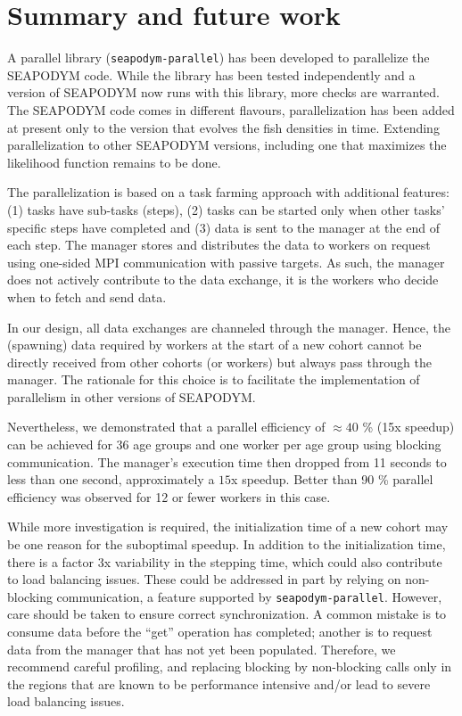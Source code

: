 \documentclass[a4paper,oneside,12pt]{article}
\begin{document}
\section{Summary and future work}

A parallel library (\verb|seapodym-parallel|) has been developed to parallelize the SEAPODYM code. While the library has been tested independently and a version
of SEAPODYM now runs with this library, more checks are warranted. The SEAPODYM code comes in different flavours, parallelization 
has been added at present only to the version that evolves the fish densities in time. Extending parallelization to other SEAPODYM versions, including one 
that maximizes the likelihood function remains to be done. 

The parallelization is based on a task farming approach with additional features: (1) tasks have sub-tasks (steps), (2) tasks 
can be started only when other tasks' specific steps have completed and (3) data is sent to the manager at the end of each step. The 
manager stores and distributes the data to workers on request using one-sided MPI communication with passive targets. As such,
the manager does not actively contribute to the data exchange, it is the workers who decide when to fetch and send data.

In our design, all data exchanges are channeled through the manager. 
Hence, the (spawning) data required by workers at the start of a new cohort cannot be directly received from other 
cohorts (or workers) but always pass through the manager. The rationale for this choice is to facilitate the implementation of parallelism
in other versions of SEAPODYM.

Nevertheless, we demonstrated that a parallel efficiency of $\approx 40$ \% (15x speedup) can be achieved for 36 age groups and one worker per age group 
using blocking communication.  
The manager's execution time then dropped from 11 seconds to less than one second, approximately a $15$x speedup. 
Better than 90 \% parallel efficiency was observed for 12 or fewer workers in this case. 

While more investigation is required, the initialization time of a new cohort may be one reason for the suboptimal speedup. In addition
to the initialization time, there is a factor 3x variability in the stepping time, which could also contribute to load balancing issues. These 
could be addressed in part by relying on non-blocking communication, a feature supported by \verb|seapodym-parallel|. However, care should be taken to ensure 
correct synchronization. A common mistake is to consume data before the ``get'' operation has completed; another
is to request data from the manager that has not yet been populated. Therefore, we recommend careful profiling, and replacing blocking by
non-blocking calls only in the regions that are known to be performance intensive and/or lead to severe load balancing issues.
\end{document}
